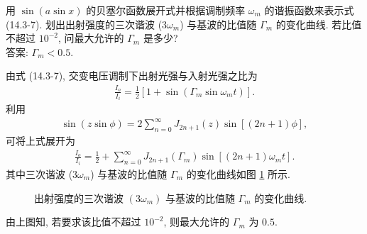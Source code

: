 \documentclass{note}
\begin{document}
\begin{exe}
    用 $\sin(a\sin x)$ 的贝塞尔函数展开式并根据调制频率 $\omega_m$ 的谐振函数来表示式 (14.3-7). 划出出射强度的三次谐波 ($3\omega_m$) 与基波的比值随 $\Gamma_m$ 的变化曲线. 若比值不超过 $10^{-2}$, 问最大允许的 $\Gamma_m$ 是多少?\\
    答案: $\Gamma_m<0.5$.
\end{exe}
\begin{sol}
    由式 (14.3-7), 交变电压调制下出射光强与入射光强之比为
    \begin{align}
        \frac{I_o}{I_i}=\frac{1}{2}[1+\sin(\Gamma_m\sin\omega_mt)].
    \end{align}
    利用
    \begin{align}
        \sin(z\sin\phi)=2\sum_{n=0}^{\infty}J_{2n+1}(z)\sin[(2n+1)\phi],
    \end{align}
    可将上式展开为
    \begin{align}
        \frac{I_o}{I_i}=\frac{1}{2}+\sum_{n=0}^{\infty}J_{2n+1}(\Gamma_m)\sin[(2n+1)\omega_mt].
    \end{align}
    其中三次谐波 ($3\omega_m$) 与基波的比值随 $\Gamma_m$ 的变化曲线如图 \ref{14.3} 所示.
    \begin{figure}[H]
        \centering
        \caption{出射强度的三次谐波 $(3\omega_m)$ 与基波的比值随 $\Gamma_m$ 的变化曲线.}
        \label{14.3}
    \end{figure}
    由上图知, 若要求该比值不超过 $10^{-2}$, 则最大允许的 $\Gamma_m$ 为 $0.5$.
\end{sol}
\end{document}
